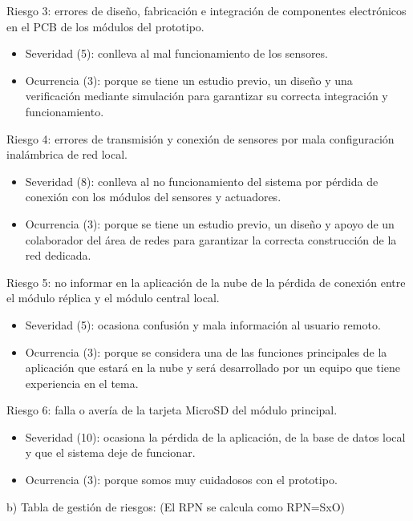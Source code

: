 \documentclass[11pt]{charter}
\begin{document}
Riesgo 3: errores de diseño, fabricación e integración de componentes electrónicos en el PCB de los módulos del prototipo.
\begin{itemize}
\item Severidad (5): conlleva al mal funcionamiento de los sensores.
\item Ocurrencia (3): porque se tiene un estudio previo, un diseño y una verificación mediante simulación para garantizar su correcta integración y funcionamiento.

\end{itemize}

Riesgo 4: errores de transmisión y conexión de sensores por mala configuración inalámbrica de red local.
\begin{itemize}
\item Severidad (8): conlleva al no funcionamiento del sistema por pérdida de conexión con los módulos del sensores y actuadores.
\item Ocurrencia (3): porque se tiene un estudio previo, un diseño y apoyo de un colaborador del área de redes para garantizar la correcta construcción de la red dedicada.
\end{itemize}

Riesgo 5: no informar en la aplicación de la nube de la pérdida de conexión entre el módulo réplica y el módulo central local.
\begin{itemize}
\item Severidad (5): ocasiona confusión y mala información al usuario remoto.
\item Ocurrencia (3): porque se considera una de las funciones principales de la aplicación que estará en la nube y será desarrollado por un equipo que tiene experiencia en el tema.
\end{itemize}

Riesgo 6: falla o avería de la tarjeta MicroSD del módulo principal.
\begin{itemize}
\item Severidad (10): ocasiona la pérdida de la aplicación, de la base de datos local y que el sistema deje de funcionar.
\item Ocurrencia (3): porque somos muy cuidadosos con el prototipo.
\end{itemize}



b) Tabla de gestión de riesgos:      (El RPN se calcula como RPN=SxO)
\end{document}

